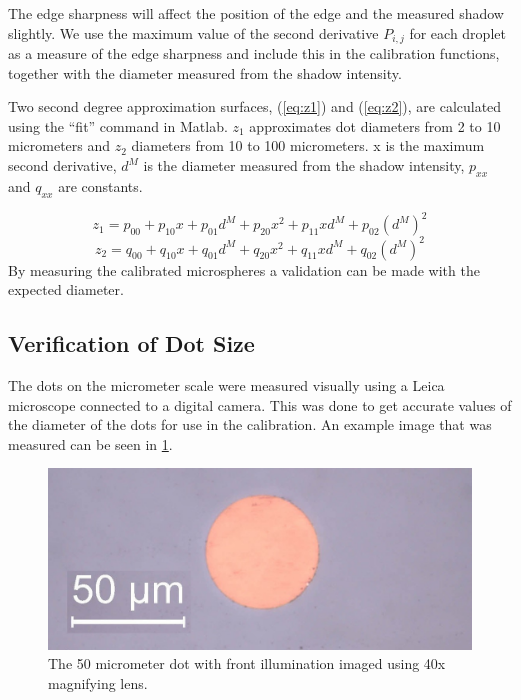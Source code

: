 The edge sharpness will affect the position of the edge and the measured shadow slightly. We use the maximum value of the second derivative $P_{i,j}$ for each droplet as a measure of the edge sharpness and include this in the calibration functions, together with the diameter measured from the shadow intensity.

Two second degree approximation surfaces, (\ref{eq:z1}) and (\ref{eq:z2}), are calculated using the “fit” command in Matlab. $z_1$ approximates dot diameters from 2 to 10 micrometers and $z_2$ diameters from 10 to 100 micrometers. x is the maximum second derivative, $d^M$ is the diameter measured from the shadow intensity, $p_{xx}$ and $q_{xx}$ are constants.

\begin{equation} \label{eq:z1}
z_1=p_{00}+p_{10} x+p_{01} d^M+p_{20} x^2+p_{11} xd^M+p_{02} {(d^M)}^2
\end{equation}
\begin{equation} \label{eq:z2}
z_2=q_{00}+q_{10} x+q_{01} d^M+q_{20} x^2+q_{11} xd^M+q_{02} {(d^M)}^2
\end{equation}
By measuring the calibrated microspheres a validation can be made with the expected diameter. 

\subsection{Verification of Dot Size}

The dots on the micrometer scale were measured visually using a Leica microscope connected to a digital camera. This was done to get accurate values of the diameter of the dots for use in the calibration. An example image that was measured can be seen in \cref{fig:50umdot40x}.

\begin{figure}[ht]
\centering\includegraphics[width=0.75\linewidth]{./figures/50umdot40x.jpg}
\caption{The 50 micrometer dot with front illumination imaged using 40x magnifying lens.}
\label{fig:50umdot40x}
\end{figure}

